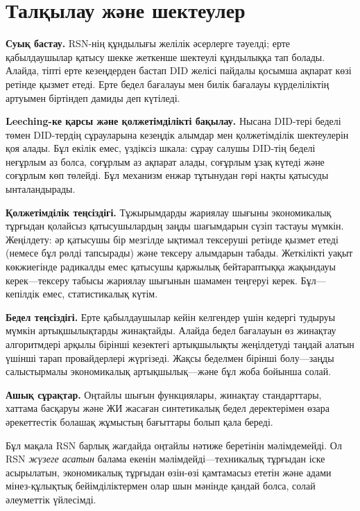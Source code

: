\documentclass[11pt,a4paper,twocolumn]{article}
\begin{document}
\section{Талқылау және шектеулер}

\textbf{Суық бастау.} RSN-нің құндылығы желілік әсерлерге тәуелді; ерте қабылдаушылар қатысу шекке жеткенше шектеулі құндылыққа тап болады. Алайда, тіпті ерте кезеңдерден бастап DID желісі пайдалы қосымша ақпарат көзі ретінде қызмет етеді. Ерте бедел бағалауы мен билік бағалауы күрделіліктің артуымен біртіндеп дамиды деп күтіледі.

\textbf{Leeching-ке қарсы және қолжетімділікті бақылау.} Нысана DID-тері беделі төмен DID-тердің сұрауларына кезеңдік алымдар мен қолжетімділік шектеулерін қоя алады. Бұл екілік емес, үздіксіз шкала: сұрау салушы DID-тің беделі неғұрлым аз болса, соғұрлым аз ақпарат алады, соғұрлым ұзақ күтеді және соғұрлым көп төлейді. Бұл механизм енжар тұтынудан гөрі нақты қатысуды ынталандырады.

\textbf{Қолжетімділік теңсіздігі.} Тұжырымдарды жариялау шығыны экономикалық тұрғыдан қолайсыз қатысушылардың заңды шағымдарын сүзіп тастауы мүмкін. Жеңілдету: әр қатысушы бір мезгілде ықтимал тексеруші ретінде қызмет етеді (немесе бұл рөлді тапсырады) және тексеру алымдарын табады. Жеткілікті уақыт көкжиегінде радикалды емес қатысушы қаржылық бейтараптыққа жақындауы керек---тексеру табысы жариялау шығынын шамамен теңгеруі керек. Бұл---кепілдік емес, статистикалық күтім.

\textbf{Бедел теңсіздігі.} Ерте қабылдаушылар кейін келгендер үшін кедергі тудыруы мүмкін артықшылықтарды жинақтайды. Алайда бедел бағалауын өз жинақтау алгоритмдері арқылы бірінші кезектегі артықшылықты жеңілдетуді таңдай алатын үшінші тарап провайдерлері жүргізеді. Жақсы беделмен бірінші болу---заңды салыстырмалы экономикалық артықшылық---және бұл жоба бойынша солай.

\textbf{Ашық сұрақтар.} Оңтайлы шығын функциялары, жинақтау стандарттары, хаттама басқаруы және ЖИ жасаған синтетикалық бедел деректерімен өзара әрекеттестік болашақ жұмыстың бағыттары болып қала береді.

Бұл мақала RSN барлық жағдайда оңтайлы нәтиже беретінін мәлімдемейді. Ол RSN \emph{жүзеге асатын} балама екенін мәлімдейді---техникалық тұрғыдан іске асырылатын, экономикалық тұрғыдан өзін-өзі қамтамасыз ететін және адами мінез-құлықтық бейімділіктермен олар шын мәнінде қандай болса, солай әлеуметтік үйлесімді.
\end{document}
